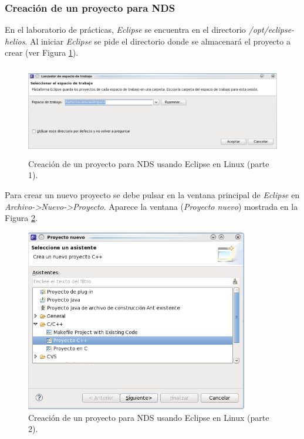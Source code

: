 \subsubsection{Creación de un proyecto para NDS}
En  el laboratorio de prácticas, \textit{Eclipse} se encuentra en el directorio \textit{/opt/eclipse-helios}.  Al iniciar \textit{Eclipse} se pide el directorio donde se almacenará el proyecto a crear (ver Figura \ref{fig_pig_p3_c1_eclipel1}).

\begin{figure}[t]
\centering
\includegraphics[height=4cm]{./Figuras/C2/c2_instan1.png}
\caption{Creación de un proyecto para NDS usando Eclipse en Linux (parte 1).}
\label{fig_pig_p3_c1_eclipel1}
 \end{figure}


Para crear un nuevo proyecto se debe pulsar en la ventana principal de \textit{Eclipse} en \textit{Archivo->Nuevo->Proyecto}.  Aparece la ventana (\textit{Proyecto nuevo}) mostrada en la Figura \ref{fig_pig_p3_c1_eclipel2}.

\begin{figure}[t]
	\centering
	\includegraphics[height=8cm]{./Figuras/C2/c2_instan2.png}
	\caption{Creación de un proyecto para NDS usando Eclipse en Linux (parte 2).}
	\label{fig_pig_p3_c1_eclipel2}
\end{figure}

